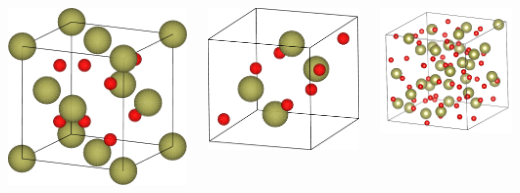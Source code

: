 \documentclass{beamer}
\begin{document}
\begin{frame}
\begin{columns}[c]
	\includegraphics[width=0.75\linewidth]{figures/tetragonal.pdf}

	\includegraphics[width=0.75\linewidth]{figures/monoclinic.pdf}

	\includegraphics[width=0.75\linewidth]{figures/am.png}
    \end{columns}

\end{frame}
\end{document}
